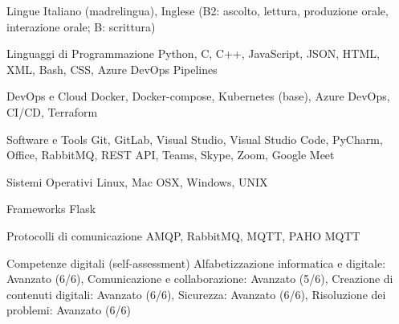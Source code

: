 
\cvskill
{Lingue} %
{Italiano (madrelingua), Inglese (B2: ascolto, lettura, produzione orale, interazione orale; B: scrittura)} %




\begin{cvskills}


\cvskill
{Linguaggi di Programmazione} %
{Python, C, C++, JavaScript, JSON, HTML, XML, Bash, CSS, Azure DevOps Pipelines} %


\cvskill
{DevOps e Cloud} %
{Docker, Docker-compose, Kubernetes (base), Azure DevOps, CI/CD, Terraform} %


\cvskill
{Software e Tools} %
{Git, GitLab, Visual Studio, Visual Studio Code, PyCharm, Office, RabbitMQ, REST API, Teams, Skype, Zoom, Google Meet} %


\cvskill
{Sistemi Operativi} %
{Linux, Mac OSX, Windows, UNIX} %


\cvskill
{Frameworks} %
{Flask} %


\cvskill
{Protocolli di comunicazione} %
{AMQP, RabbitMQ, MQTT, PAHO MQTT} %


\cvskill
{Competenze digitali (self-assessment)} %
{Alfabetizzazione informatica e digitale: Avanzato (6/6), Comunicazione e collaborazione: Avanzato (5/6), Creazione di contenuti digitali: Avanzato (6/6), Sicurezza: Avanzato (6/6), Risoluzione dei problemi: Avanzato (6/6)} %


\end{cvskills}